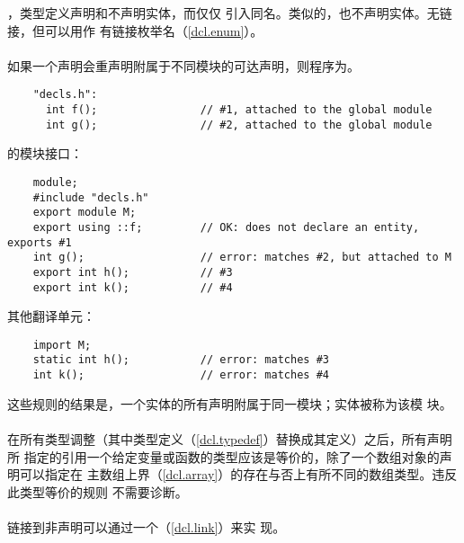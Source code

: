 \begin{note}
  ，类型定义声明和不声明实体，而仅仅
  引入同名。类似的，也不声明实体。\enumr{}无链接，但可以用作
  有链接枚举名（\ref{dcl.enum}）。
\end{note}

\paragraph{} %
如果一个声明会重声明附属于不同模块的可达声明，则程序为\illform{}。

\begin{example}
  \begin{lstlisting}
    "decls.h":
      int f();                // #1, attached to the global module
      int g();                // #2, attached to the global module
  \end{lstlisting}
  的模块接口：
  \begin{lstlisting}
    module;
    #include "decls.h"
    export module M;
    export using ::f;         // OK: does not declare an entity, exports #1
    int g();                  // error: matches #2, but attached to M
    export int h();           // #3
    export int k();           // #4
  \end{lstlisting}
  其他翻译单元：
  \begin{lstlisting}
    import M;
    static int h();           // error: matches #3
    int k();                  // error: matches #4
  \end{lstlisting}
  这些规则的结果是，一个实体的所有声明附属于同一模块；实体被称为该模
  块。
\end{example}

\paragraph{} %
在所有类型调整（其中类型定义（\ref{dcl.typedef}）替换成其定义）之后，所有声明所
指定的引用一个给定变量或函数的类型应该是等价的，除了一个数组对象的声明可以指定在
主数组上界（\ref{dcl.array}）的存在与否上有所不同的数组类型。违反此类型等价的规则
不需要诊断。

\paragraph{} %
\begin{note}
  链接到非\cpp{}声明可以通过一个（\ref{dcl.link}）来实
  现。
\end{note}

